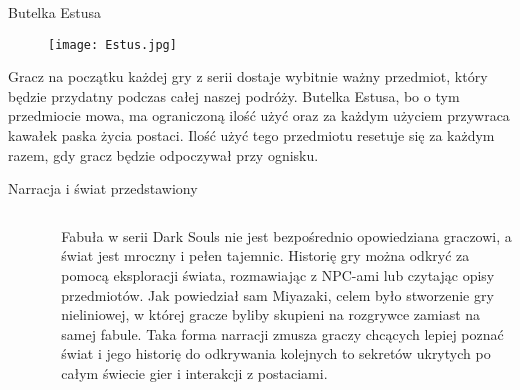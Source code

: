 \documentclass{beamer}
\begin{document}
\begin{frame}{Butelka Estusa} %

 \begin{figure}
    \centering
        \texttt{[image: Estus.jpg]}
 
    \end{figure}
\small Gracz na początku każdej gry z serii dostaje wybitnie ważny przedmiot, który będzie przydatny podczas całej naszej podróży. Butelka Estusa, bo o tym przedmiocie mowa, ma ograniczoną ilość użyć oraz za każdym użyciem przywraca kawałek paska życia postaci. Ilość użyć tego przedmiotu resetuje się za każdym razem, gdy gracz będzie odpoczywał przy ognisku.

\end{frame}

\begin{frame}{Narracja i świat przedstawiony} %
\begin{columns}

\begin{column}{0.5\textwidth}
    \begin{figure}
    \centering
        \texttt{[image: Ds3 świat.jpg]}
 
    \end{figure}
\end{column}

\begin{column}{0.5\textwidth}
\small     Fabuła w serii Dark Souls nie jest bezpośrednio opowiedziana graczowi, a świat jest mroczny i pełen tajemnic. Historię gry można odkryć za pomocą eksploracji świata, rozmawiając z NPC-ami lub czytając opisy przedmiotów. Jak powiedział sam Miyazaki, celem było stworzenie gry nieliniowej, w której gracze byliby skupieni na rozgrywce zamiast na samej fabule.  Taka forma narracji zmusza graczy chcących lepiej poznać świat i jego historię do odkrywania kolejnych to sekretów ukrytych po całym świecie gier i interakcji z postaciami.

\end{column}
\end{columns}

\end{frame}
\end{document}
